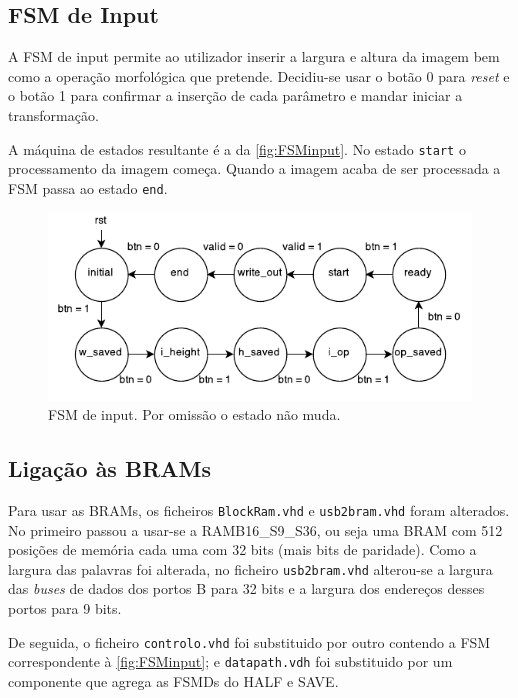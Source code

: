 \documentclass[a4paper]{article}
\begin{document}
\subsection*{FSM de Input}
A FSM de input permite ao utilizador inserir a largura e altura da imagem bem como a operação morfológica que pretende. Decidiu-se usar o botão 0 para \textit{reset} e o botão 1 para confirmar a inserção de cada parâmetro e mandar iniciar a transformação.

A máquina de estados resultante é a da \autoref{fig:FSMinput}. No estado \texttt{start} o processamento da imagem começa. Quando a imagem acaba de ser processada a FSM passa ao estado \texttt{end}.

\begin{figure}
	\centering
	\includegraphics[width=\textwidth]{controlo_FSM}
	\caption{FSM de input. Por omissão o estado não muda.}
	\label{fig:FSMinput}
\end{figure}

\subsection*{Ligação às BRAMs}
Para usar as BRAMs, os ficheiros \texttt{BlockRam.vhd} e \texttt{usb2bram.vhd} foram alterados. No primeiro passou a usar-se a RAMB16\_S9\_S36, ou seja uma BRAM com 512 posições de memória cada uma com 32 bits (mais bits de paridade). Como a largura das palavras foi alterada, no ficheiro \texttt{usb2bram.vhd} alterou-se a largura das \textit{buses} de dados dos portos B para 32 bits e a largura dos endereços desses portos para 9 bits.

De seguida, o ficheiro \texttt{controlo.vhd} foi substituido por outro contendo a FSM correspondente à \autoref{fig:FSMinput}; e \texttt{datapath.vdh} foi substituido por um componente que agrega as FSMDs do HALF e SAVE.
\end{document}
